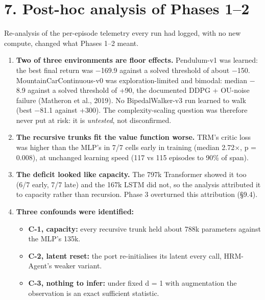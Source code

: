 \documentclass[11pt]{article}
\begin{document}
\medskip



\section*{7. Post-hoc analysis of Phases 1--2}



Re-analysis of the per-episode telemetry every run had logged, with no new compute, changed what Phases 1--2 meant.



\begin{enumerate}
\item \textbf{Two of three environments are floor effects.} Pendulum-v1 was learned: the best final return was $-$169.9 against a solved threshold of about $-$150. MountainCarContinuous-v0 was exploration-limited and bimodal: median $-$8.9 against a solved threshold of +90, the documented DDPG + OU-noise failure (Matheron et al., 2019). No BipedalWalker-v3 run learned to walk (best $-$81.1 against +300). The complexity-scaling question was therefore never put at risk: it is \emph{untested}, not disconfirmed.
\item \textbf{The recursive trunks fit the value function worse.} TRM's critic loss was higher than the MLP's in 7/7 cells early in training (median 2.72$\times$, p = 0.008), at unchanged learning speed (117 vs 115 episodes to 90\% of span).
\item \textbf{The deficit looked like capacity.} The 797k Transformer showed it too (6/7 early, 7/7 late) and the 167k LSTM did not, so the analysis attributed it to capacity rather than recursion. Phase 3 overturned this attribution (\S{}9.4).
\item \textbf{Three confounds were identified:}
\begin{itemize}
\item \textbf{C-1, capacity:} every recursive trunk held about 788k parameters against the MLP's 135k.
\item \textbf{C-2, latent reset:} the port re-initialises its latent every call, HRM-Agent's weaker variant.
\item \textbf{C-3, nothing to infer:} under fixed d = 1 with augmentation the observation is an exact sufficient statistic.
\end{itemize}
\end{enumerate}
\end{document}
